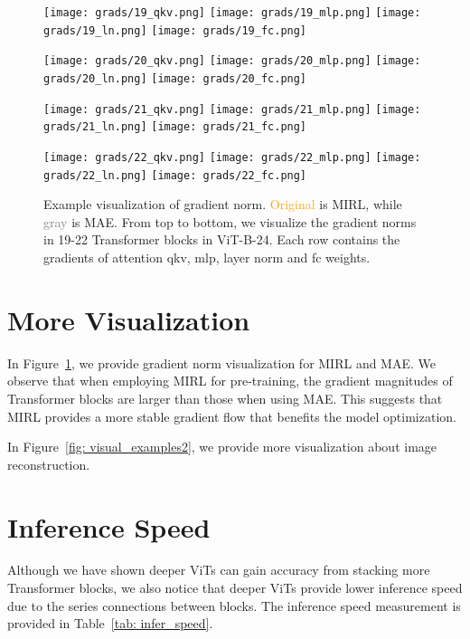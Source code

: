 \documentclass{article}
\begin{document}
\begin{figure}[!t]
\flushleft 

\texttt{[image: grads/19\_qkv.png]}
\texttt{[image: grads/19\_mlp.png]}
\texttt{[image: grads/19\_ln.png]}
\texttt{[image: grads/19\_fc.png]}

\texttt{[image: grads/20\_qkv.png]}
\texttt{[image: grads/20\_mlp.png]}
\texttt{[image: grads/20\_ln.png]}
\texttt{[image: grads/20\_fc.png]}

\texttt{[image: grads/21\_qkv.png]}
\texttt{[image: grads/21\_mlp.png]}
\texttt{[image: grads/21\_ln.png]}
\texttt{[image: grads/21\_fc.png]}

\texttt{[image: grads/22\_qkv.png]}
\texttt{[image: grads/22\_mlp.png]}
\texttt{[image: grads/22\_ln.png]}
\texttt{[image: grads/22\_fc.png]}
{\caption{\label{fig: gard_examples} Example visualization of gradient norm.
\textcolor{orange}{Original} is MIRL, while \textcolor{gray}{gray} is MAE. 
From top to bottom, we visualize the gradient norms in 19-22 Transformer blocks in ViT-B-24. Each row contains the gradients of attention qkv, mlp, layer norm and fc weights. 
}}
\end{figure}


\section{More Visualization}
In Figure~\ref{fig: gard_examples}, we provide gradient norm visualization for MIRL and MAE. We observe that when employing MIRL for pre-training, the gradient magnitudes of Transformer blocks are larger than those when using MAE. This suggests that MIRL provides a more stable gradient flow that benefits the model optimization.

In Figure~\ref{fig: visual_examples2}, we provide more visualization about image reconstruction.

\section{Inference Speed}
Although we have shown deeper ViTs can gain accuracy from stacking more Transformer blocks, we also notice that deeper ViTs provide lower inference speed due to the series connections between blocks. The inference speed measurement is provided in Table~\ref{tab: infer_speed}. 
\end{document}
